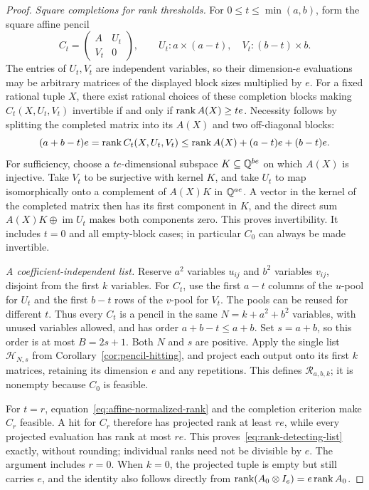 \begin{proof}
\emph{Square completions for rank thresholds.}
For $0\leq t\leq\min(a,b)$, form the square affine pencil
\[
 C_t=\begin{pmatrix}A&U_t\\ V_t&0\end{pmatrix},
 \qquad U_t:a\times(a-t),\quad V_t:(b-t)\times b.
\]
The entries of $U_t,V_t$ are independent variables, so their
dimension-$e$ evaluations may be arbitrary matrices of the displayed
block sizes multiplied by $e$. For a fixed rational tuple $X$,
there exist rational choices of these completion blocks making
$C_t(X,U_t,V_t)$ invertible if and only if
$\operatorname{rank} A(X)\geq te$. Necessity follows by splitting the
completed matrix into its $A(X)$ and two off-diagonal blocks:
\[
 (a+b-t)e=\operatorname{rank} C_t(X,U_t,V_t)
 \leq\operatorname{rank} A(X)+(a-t)e+(b-t)e.
\]
For sufficiency, choose a $te$-dimensional subspace
$K\subseteq\mathbb Q^{be}$ on which $A(X)$ is injective. Take $V_t$ to be
surjective with kernel $K$, and take $U_t$ to map isomorphically onto
a complement of $A(X)K$ in $\mathbb Q^{ae}$. A vector in the kernel of the
completed matrix then has its first component in $K$, and the direct
sum $A(X)K\oplus\operatorname{im}U_t$ makes both components zero.
This proves invertibility. It includes $t=0$ and all empty-block
cases; in particular $C_0$ can always be made invertible.

\emph{A coefficient-independent list.}
Reserve $a^2$ variables $u_{ij}$ and $b^2$ variables $v_{ij}$,
disjoint from the first $k$ variables. For $C_t$, use the first
$a-t$ columns of the $u$-pool for $U_t$ and the first $b-t$ rows of
the $v$-pool for $V_t$. The pools can be reused for different $t$.
Thus every $C_t$ is a pencil in the same
$N=k+a^2+b^2$ variables, with unused variables allowed, and has
order $a+b-t\leq a+b$. Set $s=a+b$, so this order is at most
$B=2s+1$. Both $N$ and $s$ are positive. Apply the single list
$\mathcal H_{N,s}$ from Corollary~\ref{cor:pencil-hitting}, and
project each output onto its first $k$ matrices, retaining its
dimension $e$ and any repetitions. This defines $\mathcal R_{a,b,k}$;
it is nonempty because $C_0$ is feasible.

For $t=r$, equation~\eqref{eq:affine-normalized-rank} and the
completion criterion make $C_r$ feasible. A hit for $C_r$ therefore
has projected rank at least $re$, while every projected evaluation
has rank at most $re$. This proves~\eqref{eq:rank-detecting-list}
exactly, without rounding; individual ranks need not be divisible by
$e$. The argument includes $r=0$. When $k=0$, the projected tuple is
empty but still carries $e$, and the identity also follows directly
from $\operatorname{rank}(A_0\otimes I_e)=e\operatorname{rank} A_0$.


\end{proof}
